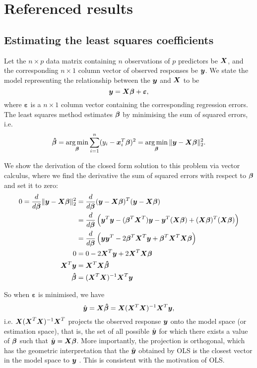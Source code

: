\documentclass[12pt]{article}
\DeclareMathOperator*{\argmin}{arg\,min}
\newcommand{\gbh}{\hat{\gb}}
\newcommand{\bmgb}{\boldsymbol{\gb}}
\newcommand{\bmge}{\boldsymbol{\varepsilon}}
\newcommand{\bmgbh}{\boldsymbol{\gbh}}
\begin{document}
	\section{Referenced results}
	\subsection{Estimating the least squares coefficients\label{sec:append1}}
	Let the $n\times p$ data matrix containing $n$ observations of $p$ predictors be $\boldsymbol{X}$, and the corresponding $n\times 1$ column vector of observed responses be $\boldsymbol{y}$. We state the model representing the relationship between the $\boldsymbol{y}$ and $\boldsymbol{X}$ to be
	$$\bmy=\bmX\bmgb+\bmge,$$
	where $\bmge$ is a $n\times 1$ column vector containing the corresponding regression errors. The least squares method estimates $\bmgb$ by minimising the sum of squared errors, i.e.
	\begin{equation}
		\bmgbh=\argmin_{\bmgb}\sum_{i=1}^{n}(y_i-\bmx_i^T\bmgb)^2=\argmin_{\bmgb}\|\bmy-\bmX\bmgb\|_2^2.
	\end{equation}
	
	We show the derivation of the closed form solution to this problem via vector calculus, where we find the derivative the sum of squared errors with respect to $\bmgb$ and set it to zero:
	 \begin{align*}
	 	0=\frac{d}{d\bmgb}\|\bmy-\bmX\bmgb\|_2^2&=\frac{d}{d\bmgb}(\bmy-\bmX\bmgb)^T(\bmy-\bmX\bmgb)\\
	 	&=\frac{d}{d\bmgb}\lt(\bmy^T\bmy-(\bmgb^T\bmX^T)\bmy-\bmy^T(\bmX\bmgb)+(\bmX\bmgb)^T(\bmX\bmgb)\rt)\\
	 	&=\frac{d}{d\bmgb}\lt(\bmy\bmy^T-2\bmgb^T\bmX^T\bmy+\bmgb^T\bmX^T\bmX\bmgb\rt)\\
	 	0&=0-2\bmX^T\bmy+2\bmX^T\bmX\bmgb\\
	 	\bmX^T\bmy&=\bmX^T\bmX\bmgbh\\
	 	\bmgbh&=(\bmX^T\bmX)^{-1}\bmX^T\bmy
	 \end{align*}
	 
	So when $\bmge$ is minimised, we have
	\begin{equation}
		\hat{\bmy}=\bmX\bmgbh=\bmX(\bmX^T\bmX)^{-1}\bmX^T\bmy,
	\end{equation}
	i.e. $\boldsymbol{X}(\boldsymbol{X}^T\boldsymbol{X})^{-1}\boldsymbol{X}^T$ projects the observed response $\boldsymbol{y}$ onto the model space (or estimation space), that is, the set of all possible $\hat{\boldsymbol{y}}$ for which there exists a value of $\bmgb$ such that $\hat{\bmy}=\bmX\bmgb$. More importantly, the projection is orthogonal, which has the geometric interpretation that the $\hat{\boldsymbol{y}}$ obtained by OLS is the closest vector in the model space to $\boldsymbol{y}$ \cite{Agresti2015}. This is consistent with the motivation of OLS.\\
	
\end{document}
